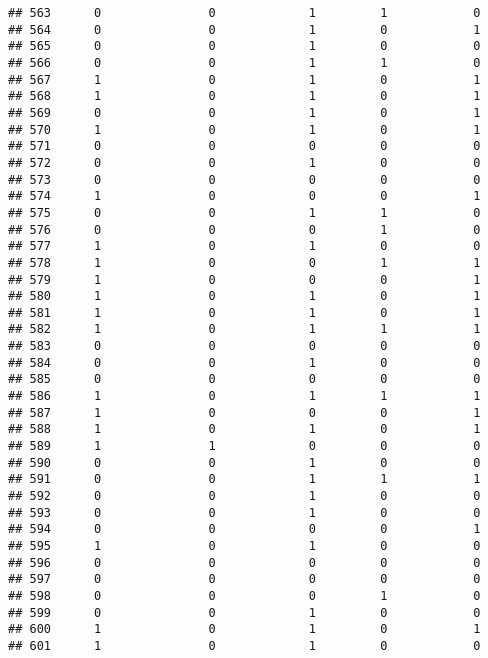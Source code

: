 \documentclass[]{article}
\begin{document}
\begin{verbatim}
## 563      0               0             1         1            0
## 564      0               0             1         0            1
## 565      0               0             1         0            0
## 566      0               0             1         1            0
## 567      1               0             1         0            1
## 568      1               0             1         0            1
## 569      0               0             1         0            1
## 570      1               0             1         0            1
## 571      0               0             0         0            0
## 572      0               0             1         0            0
## 573      0               0             0         0            0
## 574      1               0             0         0            1
## 575      0               0             1         1            0
## 576      0               0             0         1            0
## 577      1               0             1         0            0
## 578      1               0             0         1            1
## 579      1               0             0         0            1
## 580      1               0             1         0            1
## 581      1               0             1         0            1
## 582      1               0             1         1            1
## 583      0               0             0         0            0
## 584      0               0             1         0            0
## 585      0               0             0         0            0
## 586      1               0             1         1            1
## 587      1               0             0         0            1
## 588      1               0             1         0            1
## 589      1               1             0         0            0
## 590      0               0             1         0            0
## 591      0               0             1         1            1
## 592      0               0             1         0            0
## 593      0               0             1         0            0
## 594      0               0             0         0            1
## 595      1               0             1         0            0
## 596      0               0             0         0            0
## 597      0               0             0         0            0
## 598      0               0             0         1            0
## 599      0               0             1         0            0
## 600      1               0             1         0            1
## 601      1               0             1         0            0

\end{verbatim}
\end{document}
